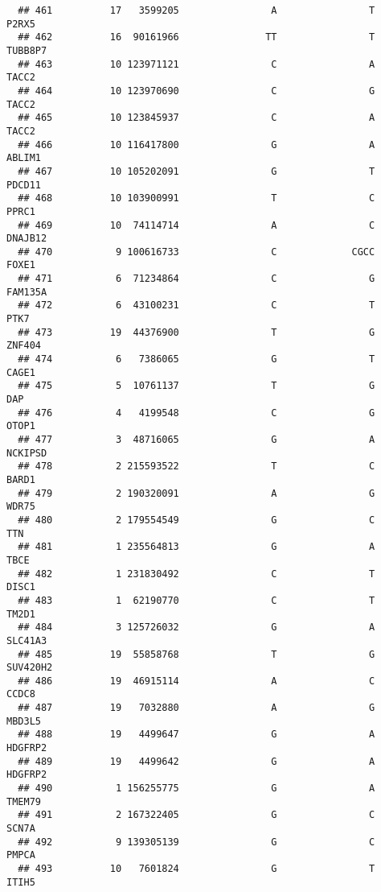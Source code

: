 \documentclass[12pt,twoside]{reedthesis}
\theoremstyle{definition}
\theoremstyle{definition}
\theoremstyle{remark}
\begin{document}
\begin{verbatim}
  ## 461          17   3599205                A                T          P2RX5
  ## 462          16  90161966               TT                T        TUBB8P7
  ## 463          10 123971121                C                A          TACC2
  ## 464          10 123970690                C                G          TACC2
  ## 465          10 123845937                C                A          TACC2
  ## 466          10 116417800                G                A         ABLIM1
  ## 467          10 105202091                G                T         PDCD11
  ## 468          10 103900991                T                C          PPRC1
  ## 469          10  74114714                A                C        DNAJB12
  ## 470           9 100616733                C             CGCC          FOXE1
  ## 471           6  71234864                C                G        FAM135A
  ## 472           6  43100231                C                T           PTK7
  ## 473          19  44376900                T                G         ZNF404
  ## 474           6   7386065                G                T          CAGE1
  ## 475           5  10761137                T                G            DAP
  ## 476           4   4199548                C                G          OTOP1
  ## 477           3  48716065                G                A        NCKIPSD
  ## 478           2 215593522                T                C          BARD1
  ## 479           2 190320091                A                G          WDR75
  ## 480           2 179554549                G                C            TTN
  ## 481           1 235564813                G                A           TBCE
  ## 482           1 231830492                C                T          DISC1
  ## 483           1  62190770                C                T          TM2D1
  ## 484           3 125726032                G                A        SLC41A3
  ## 485          19  55858768                T                G       SUV420H2
  ## 486          19  46915114                A                C          CCDC8
  ## 487          19   7032880                A                G         MBD3L5
  ## 488          19   4499647                G                A        HDGFRP2
  ## 489          19   4499642                G                A        HDGFRP2
  ## 490           1 156255775                G                A         TMEM79
  ## 491           2 167322405                G                C          SCN7A
  ## 492           9 139305139                G                C          PMPCA
  ## 493          10   7601824                G                T          ITIH5

\end{verbatim}
\end{document}
